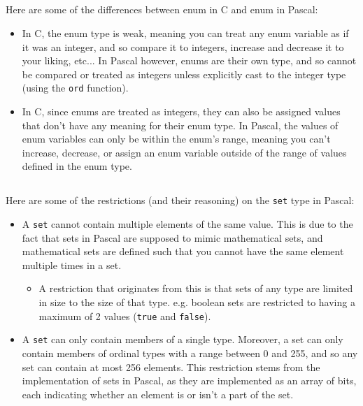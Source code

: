 \documentclass{article}
\begin{document}
\subsection{}
Here are some of the differences between enum in C and enum in Pascal:
\begin{itemize}
    \item In C, the enum type is weak, meaning you can treat any enum variable as if it was an integer, and so compare it to integers, increase and decrease it to your liking, etc... In Pascal however, enums are their own type, and so cannot be compared or treated as integers unless explicitly cast to the integer type (using the \lstinline{ord} function).
    \item In C, since enums are treated as integers, they can also be assigned values that don't have any meaning for their enum type. In Pascal, the values of enum variables can only be within the enum's range, meaning you can't increase, decrease, or assign an enum variable outside of the range of values defined in the enum type.
\end{itemize}

\subsection{}
Here are some of the restrictions (and their reasoning) on the \lstinline{set} type in Pascal:
\begin{itemize}
    \item A \lstinline{set} cannot contain multiple elements of the same value. This is due to the fact that sets in Pascal are supposed to mimic mathematical sets, and mathematical sets are defined such that you cannot have the same element multiple times in a set.
        \begin{itemize}
            \item A restriction that originates from this is that sets of any type are limited in size to the size of that type. e.g. boolean sets are restricted to having a maximum of 2 values (\lstinline{true} and \lstinline{false}).
        \end{itemize}
    \item A \lstinline{set} can only contain members of a single type. Moreover, a set can only contain members of ordinal types with a range between 0 and 255, and so any set can contain at most 256 elements. This restriction stems from the implementation of sets in Pascal, as they are implemented as an array of bits, each indicating whether an element is or isn't a part of the set.
\end{itemize}
\end{document}
